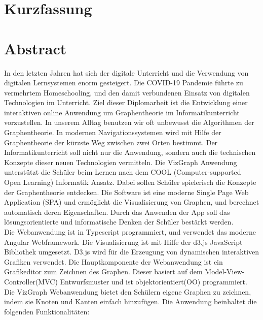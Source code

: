 {
	\let\clearpage\relax
	\ifeng
		\chapter*{Kurzfassung}
	\else
		\chapter*{Abstract}
	\fi

In den letzten Jahren hat sich der digitale Unterricht und die Verwendung von digitalen Lernsystemen enorm gesteigert. Die COVID-19 Pandemie f\"uhrte zu vermehrtem Homeschooling, und den damit verbundenen Einsatz von digitalen Technologien im Unterricht\cite{Alabdulaziz}. Ziel dieser Diplomarbeit ist die Entwicklung einer interaktiven online Anwendung um Graphentheorie im Informatikunterricht vorzustellen. In unserem Alltag benutzen wir oft unbewusst die Algorithmen der Graphentheorie. In modernen Navigationssystemen wird mit Hilfe der Graphentheorie der kürzste Weg zwischen zwei Orten bestimmt. Der Informatikunterricht soll nicht nur die Anwendung, sondern auch die technischen Konzepte dieser neuen Technologien vermitteln. Die VizGraph Anwendung unterst\"utzt die Sch\"uler beim Lernen nach dem COOL (Computer-supported Open Learning) Informatik Ansatz\cite{SabitzerCoolinfo}\cite{SabitzerCool}. Dabei sollen Sch\"uler spielerisch die Konzepte der Graphentheorie entdecken. Die Software ist eine moderne Single Page Web Application (SPA) und erm\"oglicht die Visualisierung von Graphen, und berechnet automatisch deren Eigenschaften. Durch das Anwenden der App soll das l\"osungsorientierte und informatische Denken der Sch\"uler best\"arkt werden.\\
Die Webanwendung ist in Typescript\cite{bierman2014understanding} programmiert, und verwendet das moderne Angular\cite{jain2014angularjs} Webframework. Die Visualisierung ist mit Hilfe der d3.js\cite{d3js} JavaScript Bibliothek umgesetzt. D3.js wird f\"ur die Erzeugung von dynamischen interaktiven Grafiken verwendet. Die Hauptkomponente der  Webanwendung ist ein Grafikeditor zum Zeichnen des Graphen. Dieser basiert auf dem Model-View-Controller(MVC) Entwurfsmuster und ist objektorientiert(OO) programmiert\cite{mossenbock}.\\ 
Die VizGraph Webanwendung bietet den Sch\"ulern eigene Graphen zu zeichnen, indem sie Knoten und Kanten einfach hinzuf\"ugen. Die Anwendung beinhaltet die folgenden Funktionalit\"aten:
}
